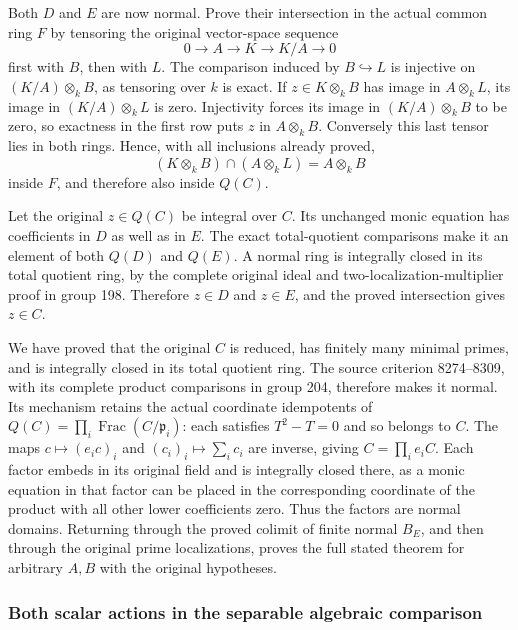 Both \(D\) and \(E\) are now normal. Prove their intersection in the actual common ring \(F\) by tensoring the original vector-space sequence \[
 0\longrightarrow A\longrightarrow K\longrightarrow K/A\longrightarrow0
\] first with \(B\), then with \(L\). The comparison induced by \(B\hookrightarrow L\) is injective on \((K/A)\otimes_kB\), as tensoring over \(k\) is exact. If \(z\in K\otimes_kB\) has image in \(A\otimes_kL\), its image in \((K/A)\otimes_kL\) is zero. Injectivity forces its image in \((K/A)\otimes_kB\) to be zero, so exactness in the first row puts \(z\) in \(A\otimes_kB\). Conversely this last tensor lies in both rings. Hence, with all inclusions already proved, \[
 (K\otimes_kB)\cap(A\otimes_kL)=A\otimes_kB
\] inside \(F\), and therefore also inside \(Q(C)\).

Let the original \(z\in Q(C)\) be integral over \(C\). Its unchanged monic equation has coefficients in \(D\) as well as in \(E\). The exact total-quotient comparisons make it an element of both \(Q(D)\) and \(Q(E)\). A normal ring is integrally closed in its total quotient ring, by the complete original ideal and two-localization-multiplier proof in group 198. Therefore \(z\in D\) and \(z\in E\), and the proved intersection gives \(z\in C\).

We have proved that the original \(C\) is reduced, has finitely many minimal primes, and is integrally closed in its total quotient ring. The source criterion 8274--8309, with its complete product comparisons in group 204, therefore makes it normal. Its mechanism retains the actual coordinate idempotents of \(Q(C)=\prod_i\operatorname{Frac}(C/\mathfrak p_i)\): each satisfies \(T^2-T=0\) and so belongs to \(C\). The maps \(c\mapsto(e_ic)_i\) and \((c_i)_i\mapsto\sum_i c_i\) are inverse, giving \(C=\prod_i e_iC\). Each factor embeds in its original field and is integrally closed there, as a monic equation in that factor can be placed in the corresponding coordinate of the product with all other lower coefficients zero. Thus the factors are normal domains. Returning through the proved colimit of finite normal \(B_E\), and then through the original prime localizations, proves the full stated theorem for arbitrary \(A,B\) with the original hypotheses.

\subsubsection{Both scalar actions in the separable algebraic comparison}\label{both-scalar-actions-in-the-separable-algebraic-comparison}

